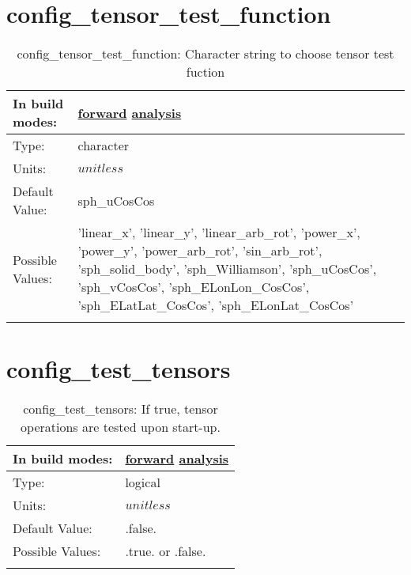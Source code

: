 \section[config\_tensor\_test\_function]{config\_tensor\_test\_function}
\label{sec:nm_sec_config_tensor_test_function}
\begin{center}
\begin{longtable}{| p{2.0in} || p{4.0in} |}
    \hline
    In build modes: & \hyperref[subsec:forward_nm_tab_testing]{forward} \hyperref[subsec:analysis_nm_tab_testing]{analysis} \\
    \hline
    Type: & character \\
    \hline
    Units: & $unitless$ \\
    \hline
    Default Value: & sph\_uCosCos \\
    \hline
    Possible Values: & 'linear\_x', 'linear\_y', 'linear\_arb\_rot', 'power\_x', 'power\_y', 'power\_arb\_rot', 'sin\_arb\_rot', 'sph\_solid\_body', 'sph\_Williamson', 'sph\_uCosCos', 'sph\_vCosCos', 'sph\_ELonLon\_CosCos', 'sph\_ELatLat\_CosCos', 'sph\_ELonLat\_CosCos' \\
    \hline
    \caption{config\_tensor\_test\_function: Character string to choose tensor test fuction}
\end{longtable}
\end{center}
\section[config\_test\_tensors]{config\_test\_tensors}
\label{sec:nm_sec_config_test_tensors}
\begin{center}
\begin{longtable}{| p{2.0in} || p{4.0in} |}
    \hline
    In build modes: & \hyperref[subsec:forward_nm_tab_testing]{forward} \hyperref[subsec:analysis_nm_tab_testing]{analysis} \\
    \hline
    Type: & logical \\
    \hline
    Units: & $unitless$ \\
    \hline
    Default Value: & .false. \\
    \hline
    Possible Values: & .true. or .false. \\
    \hline
    \caption{config\_test\_tensors: If true, tensor operations are tested upon start-up.}
\end{longtable}
\end{center}
